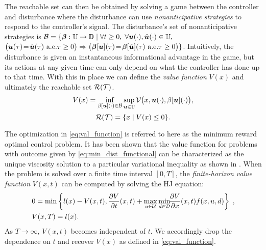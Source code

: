 

The reachable set can then be obtained by solving a game between the controller and disturbance where the disturbance can use \emph{nonanticipative strategies} to respond to the controller's signal. The disturbance's set of nonanticipative strategies is $\mathcal{B} = \{\bm{\beta}:\mathbb{U}\to\mathbb{D}\;|\;
\forall t\ge 0,\; \forall \bm{u}(\cdot),\hat{\bm{u}}(\cdot)\in\mathbb{U},$
${\big(\bm{u}(\tau) \!=\! \hat{\bm{u}}(\tau)\text{ a.e.} \tau\ge0\big)\Rightarrow
{\big(\bm{\beta}[\bm{u}](\tau) \!=\! \bm{\beta}[\hat{\bm{u}}](\tau)}{\text{ a.e.} \tau\ge0\big)}}\}$. Intuitively, the disturbance is given an instantaneous informational advantage in the game, but its actions at any given time can only depend on what the controller has done up to that time. With this in place we can define the \emph{value function} $V(x)$ and ultimately the reachable set $\mathcal{R}(\mathcal{T})$. 
%
\begin{equation} \label{eq:val_function}
V(x)=\inf_{\beta[\bm{u}](\cdot) \in \mathcal{B}} \sup_{\bm{u} \in \mathbb{U}}\mathcal{V}\big(x,\bm{u}(\cdot),\beta[\bm{u}](\cdot)\big),
\end{equation}
%
\begin{equation} \label{eq:reach_set}
\mathcal{R}(\mathcal{T}) = \{x \mid V(x) \le 0\}.
\end{equation}  

The optimization in \eqref{eq:val_function} is referred to here as the minimum reward optimal control problem. It has been shown that the value function for problems with outcome given by \eqref{eq:min_dist_functional} can be characterized as the unique viscosity solution to a particular variational inequality \cite{Barron1989,Barron1990} as shown in \cite{Fisac2015}. When the problem is solved over a finite time interval $[0,T]$, the \emph{finite-horizon value function} $V(x,t)$ can be computed by solving the HJ equation: 
%
\begin{equation} \label{eq:HJ_mr}
\begin{split} 
    & 0 = \min\left\{l(x)-V(x,t), \frac{\partial V}{\partial t}(x,t)+ \max_{u\in\mathcal{U}} \min_{ d\in\mathcal{D}} \!\!\frac{\partial V}{\partial x}(x,t) f(x,u, d)\right\} \;,\\
    &V(x,T) = l(x).
\end{split}
\end{equation}
%
 As $T \rightarrow \infty$, $V(x,t)$ becomes independent of $t$. We accordingly drop the dependence on $t$ and recover $V(x)$ as defined in \eqref{eq:val_function}. 


